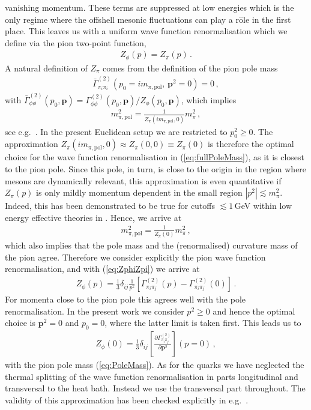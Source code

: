\documentclass[%
reprint,
superscriptaddress,
showpacs,preprintnumbers,
 amsmath,amssymb,
 aps,
prd,
]{revtex4-1}
\def\eq#1{(\ref{#1})}
\begin{document}
vanishing momentum. These terms are suppressed at low energies which
is the only regime where the offshell mesonic fluctuations can play a
r$\hat{\textrm{o}}$le in the first place. This leaves us with a
uniform wave function renormalisation which we define via the pion
two-point function,
%
\begin{align}\label{eq:ZphiZpi}
  Z_\phi(p) = Z_\pi(p)\,.
\end{align}
%
A natural definition of $Z_\pi$ comes from the definition of the pion
pole mass
\begin{align}
  \bar\Gamma^{(2)}_{\pi_i\pi_i}(p_0 = i m_{\pi,\textrm{pol}},\,
  \bm{p}^2 = 0) = 0\,,
\end{align}
with
$\bar \Gamma^{(2)}_{\phi\phi}(p_0,\bm{p})=
\Gamma_{\phi\phi}^{(2)}(p_0,\bm{p})/Z_\phi(p_0,\bm{p})$, which implies
\begin{align}\label{eq:fullPoleMass}
  m_{\pi,\textrm{pol}}^2 = \frac{1}{Z_\pi(i m_{\pi,\textrm{pol}},0)} m_\pi^2\,,
\end{align}
see e.g.\ \cite{Helmboldt:2014iya}. In the present Euclidean setup we
are restricted to $p_0^2 \geq 0$. The approximation
$Z_\pi(i m_{\pi,\textrm{pol}},0) \approx Z_\pi(0,0) \equiv Z_\pi(0)$
is therefore the optimal choice for the wave function renormalisation
in \eq{eq:fullPoleMass}, as it is closest to the pion pole. Since this
pole, in turn, is close to the origin in the region where mesons are
dynamically relevant, this approximation is even quantitative if
$Z_\pi(p)$ is only mildly momentum dependent in the small region
$|p^2| \lesssim m_\pi^2$. Indeed, this has been demonstrated to be
true for cutoffs $\lesssim 1 $\,GeV within low energy effective
theories in \cite{Helmboldt:2014iya}. Hence, we arrive at
%
\begin{align}\label{eq:PoleMass} 
  m_{\pi,\textrm{pol}}^2 = \frac{1}{Z_\pi(0)} m_\pi^2\,,
\end{align}
%
which also implies that the pole mass and the (renormalised) curvature
mass of the pion agree. Therefore we consider explicitly the pion wave
function renormalisation, and with \eq{eq:ZphiZpi} we arrive at
%
\begin{align}\label{eq:Zphi}
  Z_\phi(p) = \frac{1}{3} \delta_{i j} \frac{1}{p^2}\left[
  \Gamma^{(2)}_{\pi_i\pi_j}(p)
  - \Gamma^{(2)}_{\pi_i\pi_j}(0)\right]\,. 
\end{align}
% 
For momenta close to the pion pole this agrees well with the pole
renormalisation. In the present work we consider $p^2\geq 0$ and hence
the optimal choice is $\bm p^2 =0$ and $p_0 =0$, where the latter
limit is taken first.  This leads us to
%
\begin{align}\label{eq:NexttoPole}
  Z_\phi(0) = \frac{1}{3}\delta_{i j} \left[
  \frac{\partial\Gamma^{(2)}_{\pi_i\pi_j}}{\partial \bm{p}^2}\right](p=0)
  \,,
\end{align}
%
with the pion pole mass \eq{eq:PoleMass}. As for the quarks we have
neglected the thermal splitting of the wave function renormalisation
in parts longitudinal and transversal to the heat bath.  Instead we
use the transversal part throughout. The validity of this
approximation has been checked explicitly in e.g.\ \cite{Yin:2019ebz}.
\end{document}
